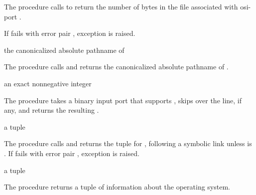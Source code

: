 The  procedure calls 
to return the number of bytes in the file associated with osi-port
.

If  fails with error pair , exception  is raised.

\begin{procedure}
\end{procedure}
\returns{} the canonicalized absolute pathname of 

The  procedure calls 
and returns the canonicalized absolute pathname of .

\begin{procedure}
\end{procedure}
\returns{} an exact nonnegative integer

The  procedure takes a binary input port
 that supports , skips over the
 line, if any, and returns the
resulting .

\begin{procedure}
\end{procedure}
\returns{} a  tuple

The  procedure calls  and returns
the  tuple for , following a symbolic link
unless  is . If  fails
with error pair , exception
 is raised.

\begin{procedure}
\end{procedure}
\returns{} a  tuple

The  procedure returns a \hyperref[uname-tuple]{}
tuple of information about the operating system.

